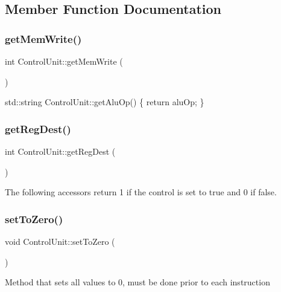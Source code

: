 \subsection{Member Function Documentation}
\mbox{\label{class_control_unit_a7fc9545b8dd4a871e1f64b78cf914773}} 
\subsubsection{\texorpdfstring{get\+Mem\+Write()}{getMemWrite()}}
{\footnotesize\ttfamily int Control\+Unit\+::get\+Mem\+Write (\begin{DoxyParamCaption}{ }\end{DoxyParamCaption})}

std\+::string Control\+Unit\+::get\+Alu\+Op() \{ return alu\+Op; \} \mbox{\label{class_control_unit_aeddfdfe24c6ec8c46394949c1a50adc7}} 
\subsubsection{\texorpdfstring{get\+Reg\+Dest()}{getRegDest()}}
{\footnotesize\ttfamily int Control\+Unit\+::get\+Reg\+Dest (\begin{DoxyParamCaption}{ }\end{DoxyParamCaption})}

The following accessors return 1 if the control is set to true and 0 if false. \mbox{\label{class_control_unit_acc570fb783844eb7c25fc0df6163270c}} 
\subsubsection{\texorpdfstring{set\+To\+Zero()}{setToZero()}}
{\footnotesize\ttfamily void Control\+Unit\+::set\+To\+Zero (\begin{DoxyParamCaption}{ }\end{DoxyParamCaption})}

Method that sets all values to 0, must be done prior to each instruction \mbox{\label{class_control_unit_ac8da21614dd49149be858ad36ceb1cb6}} 
